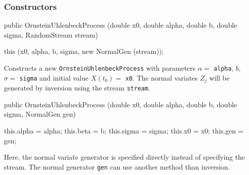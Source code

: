 \subsubsection* {Constructors}
\begin{code}

   public OrnsteinUhlenbeckProcess (double x0, double alpha, double b,
                                    double sigma, RandomStream stream)\begin{hide} {
        this (x0, alpha, b, sigma, new NormalGen (stream));
    }\end{hide}
\end{code}
\begin{tabb} Constructs a new \texttt{OrnsteinUhlenbeckProcess} with parameters
 $\alpha =$ \texttt{alpha}, $b$, $\sigma =$ \texttt{sigma} and initial value
$X(t_{0}) =$ \texttt{x0}. The normal variates $Z_j$ will be 
generated by inversion using the stream \texttt{stream}.
\end{tabb}
\begin{code}

   public OrnsteinUhlenbeckProcess (double x0, double alpha, double b,
                                    double sigma, NormalGen gen) \begin{hide} {
      this.alpha = alpha;
      this.beta  = b;
      this.sigma = sigma;
      this.x0    = x0;
      this.gen   = gen;
   }\end{hide}
\end{code}
\begin{tabb} Here, the normal variate generator is specified directly
instead of specifying the stream.
The normal generator \texttt{gen} can use another method than inversion.
\end{tabb}


